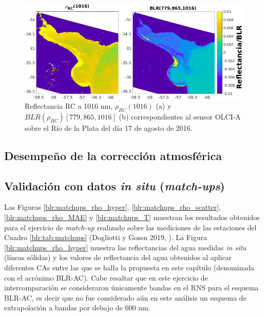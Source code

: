         \begin{figure}
        \centering
        \includegraphics[width=\textwidth]{blr/figures/blrRhoRC1016Noise.png}
        \caption{Reflectancia RC a 1016 nm, $\rho_{RC}(1016)$ (a) y $BLR(\rho_{RC})[779,865,1016]$ (b) correspondientes al sensor OLCI-A sobre el Río de la Plata del día 17 de agosto de 2016.}
        \label{blr:blrRhoRC1016Noise}
        \end{figure}

    \subsection{Desempeño de la corrección atmosférica}
    \label{blr:s:results:blrac}

        \subsection{Validación con datos \textit{in situ} (\textit{match-ups})}
        \label{blr:s:results:blrac:matchups}

            Las Figuras \ref{blr:matchups_rho_hyper}, \ref{blr:matchups_rho_scatter}, \ref{blr:matchups_rho_MAE} y \ref{blr:matchups_T} muestran los resultados obtenidos para el ejercicio de \textit{match-up} realizado sobre las mediciones de las estaciones del Cuadro \ref{blr:tab:matchups} (Dogliotti y Gossn 2019, \cite{dogliottiGossn2019}). La Figura \ref{blr:matchups_rho_hyper} muestra las reflectancias del agua medidas \textit{in situ} (líneas sólidas) y los valores de reflectancia del agua obtenidos al aplicar diferentes CAs entre las que se halla la propuesta en este capítulo (denominada con el acrónimo BLR-AC). Cabe resaltar que en este ejercicio de intercomparación se consideraron únicamente bandas en el RNS para el esquema BLR-AC, es decir que no fue considerado aún en este análisis un esquema de extrapolación a bandas por debajo de 600 nm. 
            
